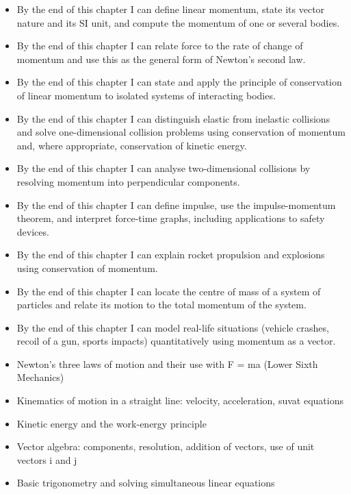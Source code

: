 \documentclass[11pt]{article}
\begin{document}
\begin{objectifs}
\begin{itemize}
\item By the end of this chapter I can define linear momentum, state its vector nature and its SI unit, and compute the momentum of one or several bodies.
\item By the end of this chapter I can relate force to the rate of change of momentum and use this as the general form of Newton's second law.
\item By the end of this chapter I can state and apply the principle of conservation of linear momentum to isolated systems of interacting bodies.
\item By the end of this chapter I can distinguish elastic from inelastic collisions and solve one-dimensional collision problems using conservation of momentum and, where appropriate, conservation of kinetic energy.
\item By the end of this chapter I can analyse two-dimensional collisions by resolving momentum into perpendicular components.
\item By the end of this chapter I can define impulse, use the impulse-momentum theorem, and interpret force-time graphs, including applications to safety devices.
\item By the end of this chapter I can explain rocket propulsion and explosions using conservation of momentum.
\item By the end of this chapter I can locate the centre of mass of a system of particles and relate its motion to the total momentum of the system.
\item By the end of this chapter I can model real-life situations (vehicle crashes, recoil of a gun, sports impacts) quantitatively using momentum as a vector.
\end{itemize}
\end{objectifs}

\begin{prerequis}
\begin{itemize}
\item Newton's three laws of motion and their use with F = ma (Lower Sixth Mechanics)
\item Kinematics of motion in a straight line: velocity, acceleration, suvat equations
\item Kinetic energy and the work-energy principle
\item Vector algebra: components, resolution, addition of vectors, use of unit vectors i and j
\item Basic trigonometry and solving simultaneous linear equations
\end{itemize}
\end{prerequis}
\end{document}
